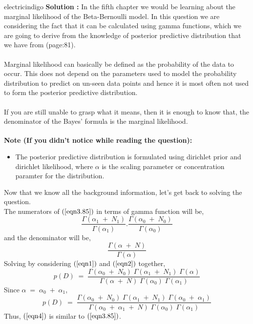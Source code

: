 \documentclass[12pt]{article}
\begin{document}
\vspace{0.3cm}				
			
\begin{mybox}{electricindigo}{}
	\textbf{Solution :} 
	In the fifth chapter we would be learning about the marginal likelihood of the Beta-Bernoulli model. In this question we are considering the fact that it can be calculated using gamma functions, which we are going to derive from the knowledge of posterior predictive distribution that we have from (page:81).\\\\
	Marginal likelihood can basically be defined as the probability of the data to occur. This does not depend on the parameters used to model the probability distribution to predict on un-seen data points and hence it is most often not used to form the posterior predictive distribution.\\\\
	If you are still unable to grasp what it means, then it is enough to know that, the denominator of the Bayes' formula is the marginal likelihood.\\\\
	\textbf{Note (If you didn't notice while reading the question):}
	\begin{itemize}
		\item The posterior predictive distribution is formulated using dirichlet prior and dirichlet likelihood, where $\alpha$ is the scaling parameter or concentration paramter for the distribution.
	\end{itemize}
	Now that we know all the background information, let's get back to solving the question.\\
	The numerators of $(\ref{eqn3.85})$ in terms of gamma function will be,
	\begin{equation}
	\dfrac{\Gamma(\alpha_1\;+\;N_1)}{\Gamma(\alpha_1)}.\dfrac{\Gamma(\alpha_0\;+\;N_0)}{\Gamma(\alpha_0)} \label{eqn1}
	\end{equation}
	and the denominator will be,
	\begin{equation}
	\dfrac{\Gamma(\alpha\;+\;N)}{\Gamma(\alpha)} \label{eqn2}
	\end{equation}
	Solving by considering $(\ref{eqn1})$ and $(\ref{eqn2})$ together,
	\begin{equation}
	p(D)\;=\;\dfrac{\Gamma(\alpha_0\;+\;N_0)\;\Gamma(\alpha_1\;+\;N_1)\;\Gamma(\alpha)}{\Gamma(\alpha\;+\;N)\;\Gamma(\alpha_0)\;\Gamma(\alpha_1)}
	\end{equation}
	Since $\alpha\;=\;\alpha_0\;+\;\alpha_1$,
	\begin{equation}
	p(D)\;=\;\dfrac{\Gamma(\alpha_0\;+\;N_0)\;\Gamma(\alpha_1\;+\;N_1)\;\Gamma(\alpha_0\;+\;\alpha_1)}{\Gamma(\alpha_0\;+\;\alpha_1\;+\;N)\;\Gamma(\alpha_0)\;\Gamma(\alpha_1)} \label{eqn4}
	\end{equation}
	Thus, $(\ref{eqn4})$ is similar to $(\ref{eqn3.85})$.

	

\end{mybox}


	

		
		
\end{document}
